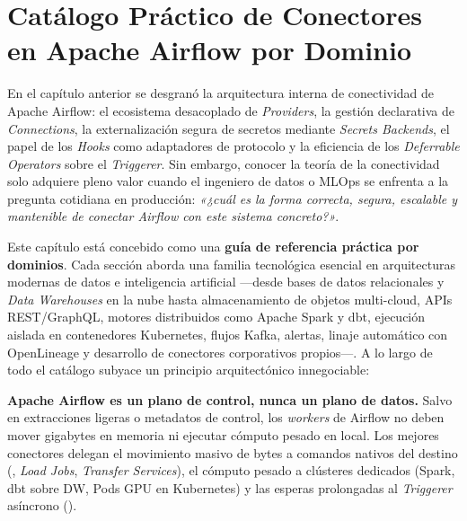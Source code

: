 
\chapter{Catálogo Práctico de Conectores en Apache Airflow por Dominio}\label{chap:airflow-conectores}

En el capítulo anterior se desgranó la arquitectura interna de conectividad de Apache Airflow: el ecosistema desacoplado de \textit{Providers}, la gestión declarativa de \textit{Connections}, la externalización segura de secretos mediante \textit{Secrets Backends}, el papel de los \textit{Hooks} como adaptadores de protocolo y la eficiencia de los \textit{Deferrable Operators} sobre el \textit{Triggerer}. Sin embargo, conocer la teoría de la conectividad solo adquiere pleno valor cuando el ingeniero de datos o MLOps se enfrenta a la pregunta cotidiana en producción: \textit{«¿cuál es la forma correcta, segura, escalable y mantenible de conectar Airflow con este sistema concreto?»}.

Este capítulo está concebido como una \textbf{guía de referencia práctica por dominios}. Cada sección aborda una familia tecnológica esencial en arquitecturas modernas de datos e inteligencia artificial ---desde bases de datos relacionales y \textit{Data Warehouses} en la nube hasta almacenamiento de objetos multi-cloud, APIs REST/GraphQL, motores distribuidos como Apache Spark y dbt, ejecución aislada en contenedores Kubernetes, flujos Kafka, alertas, linaje automático con OpenLineage y desarrollo de conectores corporativos propios---. A lo largo de todo el catálogo subyace un principio arquitectónico innegociable:

\begin{infobox}
\textbf{Apache Airflow es un plano de control, nunca un plano de datos.} Salvo en extracciones ligeras o metadatos de control, los \textit{workers} de Airflow no deben mover gigabytes en memoria ni ejecutar cómputo pesado en local. Los mejores conectores delegan el movimiento masivo de bytes a comandos nativos del destino (, \textit{Load Jobs}, \textit{Transfer Services}), el cómputo pesado a clústeres dedicados (Spark, dbt sobre DW, Pods GPU en Kubernetes) y las esperas prolongadas al \textit{Triggerer} asíncrono ().
\end{infobox}

